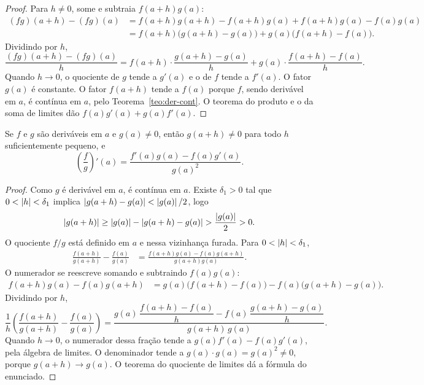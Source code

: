 \documentclass[11pt,a4paper]{article}
\begin{document}
\begin{proof}
Para $h\neq 0$, some e subtraia $f(a+h)g(a)$:
\begin{align*}
(fg)(a+h)-(fg)(a)
&= f(a+h)g(a+h)-f(a+h)g(a)+f(a+h)g(a)-f(a)g(a)\\
&= f(a+h)\bigl(g(a+h)-g(a)\bigr)+g(a)\bigl(f(a+h)-f(a)\bigr).
\end{align*}
Dividindo por $h$,
\[
\frac{(fg)(a+h)-(fg)(a)}{h}
= f(a+h)\cdot\frac{g(a+h)-g(a)}{h}+g(a)\cdot\frac{f(a+h)-f(a)}{h}.
\]
Quando $h\to 0$, o quociente de $g$ tende a $g'(a)$ e o de $f$ tende a $f'(a)$. O fator $g(a)$ \'e constante. O fator $f(a+h)$ tende a $f(a)$ porque $f$, sendo deriv\'avel em $a$, \'e cont\'inua em $a$, pelo Teorema~\ref{teo:der-cont}. O teorema do produto e o da soma de limites d\~ao $f(a)g'(a)+g(a)f'(a)$.
\end{proof}

\begin{teorema}[Quociente]
\label{teo:quociente-der}
Se $f$ e $g$ s\~ao deriv\'aveis em $a$ e $g(a)\neq 0$, ent\~ao $g(a+h)\neq 0$ para todo $h$ suficientemente pequeno, e
\[
\left(\frac{f}{g}\right)'(a)=\frac{f'(a)g(a)-f(a)g'(a)}{g(a)^2}.
\]
\end{teorema}

\begin{proof}
Como $g$ \'e deriv\'avel em $a$, \'e cont\'inua em $a$. Existe $\delta_1>0$ tal que $0<\left\lvert h \right\rvert<\delta_1$ implica $\left\lvert g(a+h)-g(a) \right\rvert<\left\lvert g(a) \right\rvert/2$, logo
\[
\left\lvert g(a+h) \right\rvert\ge \left\lvert g(a) \right\rvert-\left\lvert g(a+h)-g(a) \right\rvert>\frac{\left\lvert g(a) \right\rvert}{2}>0.
\]
O quociente $f/g$ est\'a definido em $a$ e nessa vizinhan\c{c}a furada. Para $0<\left\lvert h \right\rvert<\delta_1$,
\begin{align*}
\frac{f(a+h)}{g(a+h)}-\frac{f(a)}{g(a)}
&=\frac{f(a+h)g(a)-f(a)g(a+h)}{g(a+h)g(a)}.
\end{align*}
O numerador se reescreve somando e subtraindo $f(a)g(a)$:
\begin{align*}
f(a+h)g(a)-f(a)g(a+h)
&= g(a)\bigl(f(a+h)-f(a)\bigr)-f(a)\bigl(g(a+h)-g(a)\bigr).
\end{align*}
Dividindo por $h$,
\[
\frac{1}{h}\left(\frac{f(a+h)}{g(a+h)}-\frac{f(a)}{g(a)}\right)
=\frac{ g(a)\,\dfrac{f(a+h)-f(a)}{h} - f(a)\,\dfrac{g(a+h)-g(a)}{h} }{ g(a+h)\,g(a) }.
\]
Quando $h\to 0$, o numerador dessa fra\c{c}\~ao tende a $g(a)f'(a)-f(a)g'(a)$, pela \'algebra de limites. O denominador tende a $g(a)\cdot g(a)=g(a)^2\neq 0$, porque $g(a+h)\to g(a)$. O teorema do quociente de limites d\'a a f\'ormula do enunciado.
\end{proof}
\end{document}
